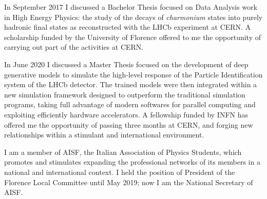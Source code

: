 \documentclass[a4, 11pt]{report}
\begin{document}
    \vskip 3mm
    
    \noindent
    In September 2017 I discussed a Bachelor Thesis focused on Data Analysis work in High Energy Physics: the study of the decays of \textit{charmonium} states into purely hadronic final states as reconstructed with the LHCb experiment at CERN. A scholarship funded by the University of Florence offered to me the opportunity of carrying out part of the activities at CERN.

    \vskip 3mm
    
    \noindent
    In June 2020 I discussed a Master Thesis focused on the development of deep generative models to simulate the high-level response of the Particle Identification system of the LHCb detector. The trained models were then integrated within a new simulation framework designed to outperform the traditional simulation programs, taking full advantage of modern softwares for parallel computing and exploiting efficiently hardware accelerators.
    A fellowship funded by INFN has offered me the opportunity of passing three months at CERN, and forging new relationships within a stimulant and international environment.
    
    \vskip 3mm
    
    \noindent
    I am a member of AISF, the Italian Association of Physics Students, which promotes and stimulates expanding the professional networks of its members in a national and international context. I held the position of President of the Florence Local Committee until May 2019; now I am the National Secretary of AISF.
    
    \vskip 9mm
    
\end{document}
